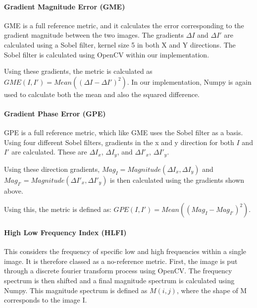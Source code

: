 \documentclass[10pt,a4paper]{article}
\begin{document}
                
            \paragraph{Gradient Magnitude Error (GME)}
                GME is a full reference metric, and it calculates the error corresponding to the gradient magnitude between the two images. The gradients $\Delta I$ and $\Delta I'$
                are calculated using a Sobel filter, kernel size 5 in both X and Y directions. The Sobel filter is calculated using OpenCV within our implementation.

                Using these gradients, the metric is calculated as $GME(I, I') = Mean((\Delta I - \Delta I')^2)$. In our implementation, Numpy is again used to calculate both the mean and
                also the squared difference.

            \paragraph{Gradient Phase Error (GPE)}
                GPE is a full reference metric, which like GME uses the Sobel filter as a basis. Using four different Sobel filters, gradients in the x and y direction for both
                $I$ and $I'$ are calculated. These are $\Delta I_x$, $\Delta I_y$, and $\Delta I'_x$, $\Delta I'_y$.

                Using these direction gradients, $Mag_{I} = Magnitude(\Delta I_x, \Delta I_y)$ and $Mag_{I'} = Magnitude(\Delta I'_x, \Delta I'_y)$ is then calculated using the gradients shown above.

                Using this, the metric is defined as: $GPE(I, I') = Mean((Mag_{I} - Mag_{I'})^2)$.

            \paragraph{High Low Frequency Index (HLFI)}
                This considers the frequency of specific low and high frequencies within a single image. It is therefore classed as a no-reference metric.
                First, the image is put through a discrete fourier transform process using OpenCV. The frequency spectrum is then shifted and a final magnitude spectrum
                is calculated using Numpy. This magnitude spectrum is defined as $M(i, j)$, where the shape of M corresponds to the image I.
\end{document}
